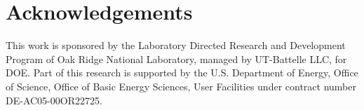 \documentclass{article}
\begin{document}
\section{Acknowledgements}\label{acknowledgements}

This work is sponsored by the Laboratory Directed Research and
Development Program of Oak Ridge National Laboratory, managed by
UT-Battelle LLC, for DOE. Part of this research is supported by the U.S.
Department of Energy, Office of Science, Office of Basic Energy
Sciences, User Facilities under contract number DE-AC05-00OR22725.





\end{document}
